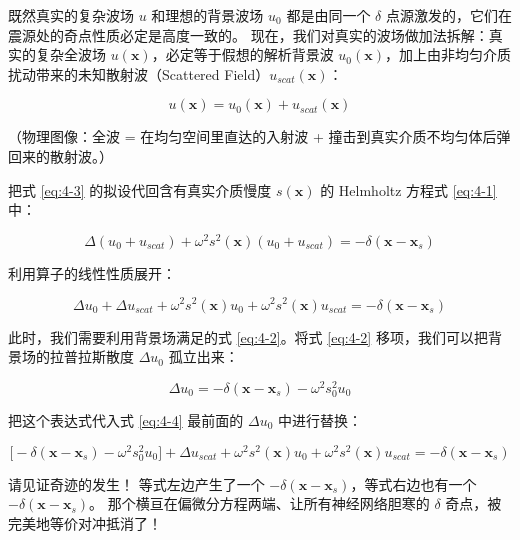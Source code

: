 \documentclass[12pt]{article}
\begin{document}
{既然真实的复杂波场 $u$ 和理想的背景波场 $u_0$ 都是由同一个 $\delta$ 点源激发的，它们在震源处的奇点性质必定是高度一致的。
现在，我们对真实的波场做加法拆解：真实的复杂全波场 $u(\mathbf{x})$，必定等于假想的解析背景波 $u_0(\mathbf{x})$，加上由非均匀介质扰动带来的未知散射波（Scattered Field）$u_{scat}(\mathbf{x})$：

\begin{equation}
u(\mathbf{x}) = u_0(\mathbf{x}) + u_{scat}(\mathbf{x})
\label{eq:4-3}
\end{equation}

（物理图像：全波 = 在均匀空间里直达的入射波 + 撞击到真实介质不均匀体后弹回来的散射波。）

把式 \eqref{eq:4-3} 的拟设代回含有真实介质慢度 $s(\mathbf{x})$ 的 Helmholtz 方程式 \eqref{eq:4-1} 中：

\begin{equation}
\Delta (u_0 + u_{scat}) + \omega^2 s^2(\mathbf{x}) (u_0 + u_{scat}) = -\delta(\mathbf{x} - \mathbf{x}_s)
\label{eq:4-substitute}
\end{equation}

利用算子的线性性质展开：

\begin{equation}
\Delta u_0 + \Delta u_{scat} + \omega^2 s^2(\mathbf{x}) u_0 + \omega^2 s^2(\mathbf{x}) u_{scat} = -\delta(\mathbf{x} - \mathbf{x}_s)
\label{eq:4-4}
\end{equation}

此时，我们需要利用背景场满足的式 \eqref{eq:4-2}。将式 \eqref{eq:4-2} 移项，我们可以把背景场的拉普拉斯散度 $\Delta u_0$ 孤立出来：

\begin{equation}
\Delta u_0 = -\delta(\mathbf{x} - \mathbf{x}_s) - \omega^2 s_0^2 u_0
\label{eq:4-delta-u0}
\end{equation}

把这个表达式代入式 \eqref{eq:4-4} 最前面的 $\Delta u_0$ 中进行替换：

\begin{equation}
\big[ -\delta(\mathbf{x} - \mathbf{x}_s) - \omega^2 s_0^2 u_0 \big] + \Delta u_{scat} + \omega^2 s^2(\mathbf{x}) u_0 + \omega^2 s^2(\mathbf{x}) u_{scat} = -\delta(\mathbf{x} - \mathbf{x}_s)
\label{eq:4-cancel-pre}
\end{equation}

请见证奇迹的发生！
等式左边产生了一个 $-\delta(\mathbf{x} - \mathbf{x}_s)$，等式右边也有一个 $-\delta(\mathbf{x} - \mathbf{x}_s)$。
那个横亘在偏微分方程两端、让所有神经网络胆寒的 $\delta$ 奇点，被完美地等价对冲抵消了！

}
\end{document}
